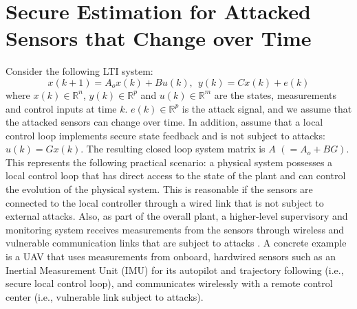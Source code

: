 \documentclass[../../thesis.tex]{subfiles}
\begin{document}
\section{Secure Estimation for Attacked Sensors that Change over Time}\label{sec:main}



Consider the following LTI system:
\begin{equation}
x(k+1) = A_o x(k) + B u(k), ~~ y(k) = C x (k) + e(k)
\label{eq:system_model_se}
\end{equation} 
where $x(k) \in \mathbb{R}^n$, $y(k)  \in \mathbb{R}^p$ and $u(k) \in \mathbb{R}^m$ are the states, measurements and control inputs at time $k$. $e(k) \in \mathbb{R}^p$ is the attack signal, and we assume that the attacked sensors can change over time. 
In addition, assume that a local control loop implements secure state feedback and is not subject to attacks: $u(k) = Gx(k)$. 
The resulting closed loop system matrix is $A$ $(=A_o+BG)$. 
This represents the following practical scenario: a physical system possesses a local control loop that has direct access to the state of the plant and can control the evolution of the physical system. 
This is reasonable if the sensors are connected to the local controller through a wired link that is not subject to external attacks. 
Also, as part of the overall plant, a higher-level supervisory and monitoring system receives measurements from the sensors through wireless and vulnerable communication links that are subject to attacks \cite{Fawzi:2014}. 
A concrete example is a UAV that uses measurements from onboard, hardwired sensors such as an Inertial Measurement Unit (IMU) for its autopilot and trajectory following (i.e., secure local control loop), and communicates wirelessly with a remote control center (i.e., vulnerable link subject to attacks).%
\end{document}
